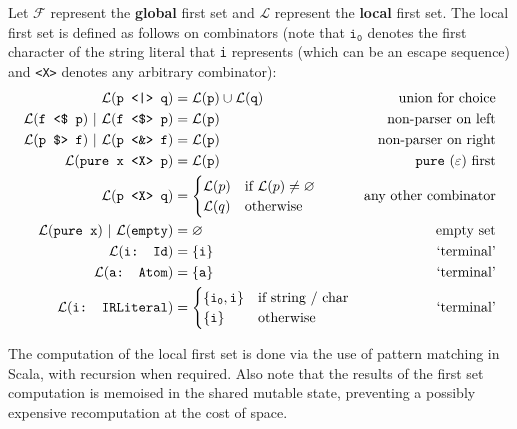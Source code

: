 Let $\mathcal{F}$ represent the \textbf{global} first set and $\mathcal{L}$ represent the \textbf{local} first set.
The local first set is defined as follows on combinators (note that $\texttt{i}_\texttt{0}$ denotes the first character of the string literal that \texttt{i} represents (which can be an escape sequence) and \texttt{<X>} denotes any arbitrary combinator):
\begin{align*}
    \mathcal{L}(\texttt{p \choice q}) & = \mathcal{L}(\texttt{p}) \cup \mathcal{L}(\texttt{q}) & \text{union for choice} \\
    \mathcal{L}(\texttt{f \constfmapl p})\ |\ \mathcal{L}(\texttt{f \fmap p}) & = \mathcal{L}(\texttt{p}) & \text{non-parser on left} \\
    \mathcal{L}(\texttt{p \constfmapr f})\ |\ \mathcal{L}(\texttt{p \pamf f}) & = \mathcal{L}(\texttt{p}) & \text{non-parser on right} \\
    \mathcal{L}(\texttt{pure x <X> p}) & = \mathcal{L}(\texttt{p}) & \text{\texttt{pure} ($\varepsilon$) first} \\
    \mathcal{L}(\texttt{p <X> q}) & = \begin{cases}
        \mathcal{L}(p) & \text{if } \mathcal{L}(p) \neq \varnothing \\
        \mathcal{L}(q) & \text{otherwise}
    \end{cases} & \text{any other combinator} \\
    \mathcal{L}(\texttt{pure x})\ |\ \mathcal{L}(\texttt{empty}) & = \varnothing & \text{empty set} \\
    \mathcal{L}(\texttt{i: Id}) & = \{ \texttt{i} \} & \text{`terminal'}\\
    \mathcal{L}(\texttt{a: Atom}) & = \{ \texttt{a} \} & \text{`terminal'} \\
    \mathcal{L}(\texttt{i: IRLiteral}) & = \begin{cases}
        \{ \texttt{i}_\texttt{0}, \texttt{i} \} & \text{if string / char} \\
        \{ \texttt{i} \} & \text{otherwise}
    \end{cases} & \text{`terminal'}
\end{align*}

The computation of the local first set is done via the use of pattern matching in Scala, with recursion when required.
Also note that the results of the first set computation is memoised in the shared mutable state, preventing a possibly expensive recomputation at the cost of space.

